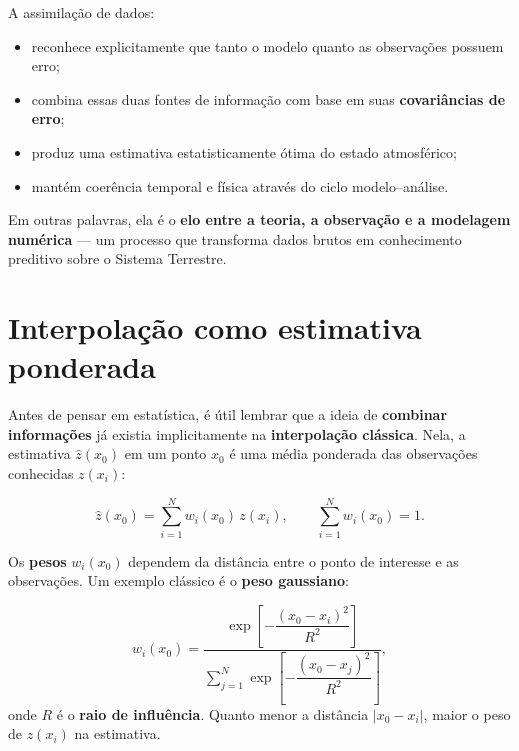 \begin{tcolorbox}[colback=yellow!5!white,title={Síntese}]
A assimilação de dados:
\begin{itemize}
    \item reconhece explicitamente que tanto o modelo quanto as observações possuem erro;
    \item combina essas duas fontes de informação com base em suas \textbf{covariâncias de erro};
    \item produz uma estimativa estatisticamente ótima do estado atmosférico;
    \item mantém coerência temporal e física através do ciclo modelo--análise.
\end{itemize}
Em outras palavras, ela é o \textbf{elo entre a teoria, a observação e a modelagem numérica} --- um processo que transforma dados brutos em conhecimento preditivo sobre o Sistema Terrestre.
\end{tcolorbox}


\section{Interpolação como estimativa ponderada}

Antes de pensar em estatística, é útil lembrar que a ideia de \textbf{combinar informações} já existia implicitamente na \textbf{interpolação clássica}.  
Nela, a estimativa \( \hat{z}(x_0) \) em um ponto \( x_0 \) é uma média ponderada das observações conhecidas \( z(x_i) \):

\begin{equation}
\hat{z}(x_0) = \sum_{i=1}^{N} w_i(x_0)\, z(x_i),
\qquad 
\sum_{i=1}^{N} w_i(x_0) = 1.
\label{eq:interp}
\end{equation}

Os \textbf{pesos} \( w_i(x_0) \) dependem da distância entre o ponto de interesse e as observações.  
Um exemplo clássico é o \textbf{peso gaussiano}:

\begin{equation}
w_i(x_0)
= 
\dfrac{
\exp\!\left[-\dfrac{(x_0 - x_i)^2}{R^2}\right]
}{
\sum_{j=1}^{N} 
\exp\!\left[-\dfrac{(x_0 - x_j)^2}{R^2}\right]
},
\label{eq:gaussian_weight}
\end{equation}
onde \( R \) é o \textbf{raio de influência}.  
Quanto menor a distância \(|x_0 - x_i|\), maior o peso de \(z(x_i)\) na estimativa.

